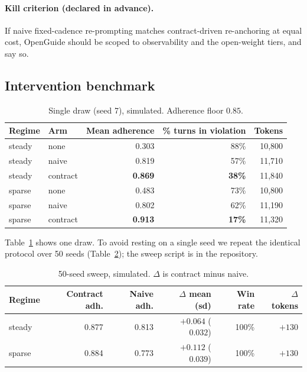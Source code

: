 \documentclass[11pt]{article}
\newcommand{\sys}{OpenGuide}
\begin{document}
\paragraph{Kill criterion (declared in advance).}
If naive fixed-cadence re-prompting matches contract-driven re-anchoring at equal
cost, \sys{} should be scoped to observability and the open-weight tiers, and say
so.

\subsection{Intervention benchmark}

\begin{table}[t]
\centering
\caption{Single draw (seed 7), simulated. Adherence floor $0.85$.}
\label{tab:t1}
\begin{tabular}{@{}llrrr@{}}
\toprule
Regime & Arm & Mean adherence & \% turns in violation & Tokens \\
\midrule
steady & none     & 0.303 & 88\% & 10{,}800 \\
steady & naive    & 0.819 & 57\% & 11{,}710 \\
steady & contract & \textbf{0.869} & \textbf{38\%} & 11{,}840 \\
sparse & none     & 0.483 & 73\% & 10{,}800 \\
sparse & naive    & 0.802 & 62\% & 11{,}190 \\
sparse & contract & \textbf{0.913} & \textbf{17\%} & 11{,}320 \\
\bottomrule
\end{tabular}
\end{table}

Table~\ref{tab:t1} shows one draw. To avoid resting on a single seed we repeat the
identical protocol over 50 seeds (Table~\ref{tab:sweep}); the sweep script is in
the repository.

\begin{table}[t]
\centering
\caption{50-seed sweep, simulated. $\Delta$ is contract minus naive.}
\label{tab:sweep}
\begin{tabular}{@{}lrrrrr@{}}
\toprule
Regime & Contract adh. & Naive adh. & $\Delta$ mean (sd) & Win rate & $\Delta$ tokens \\
\midrule
steady & 0.877 & 0.813 & $+0.064$ ($0.032$) & 100\% & $+130$ \\
sparse & 0.884 & 0.773 & $+0.112$ ($0.039$) & 100\% & $+130$ \\
\bottomrule
\end{tabular}
\end{table}
\end{document}
